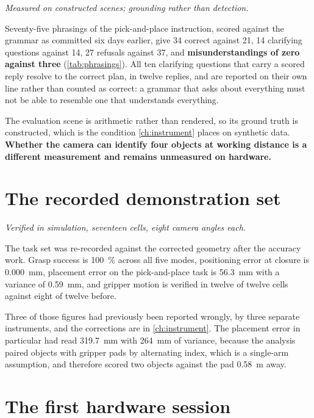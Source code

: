 \emph{Measured on constructed scenes; grounding rather than detection.}

Seventy-five phrasings of the pick-and-place instruction, scored against the
grammar as committed six days earlier, give 34 correct against 21, 14
clarifying questions against 14, 27 refusals against 37, and
\textbf{misunderstandings of zero against three}
(\cref{tab:phrasings}). All ten clarifying questions that carry a scored reply
resolve to the correct plan, in twelve replies, and are reported on their own
line rather than counted as correct: a grammar that asks about everything must
not be able to resemble one that understands everything.

The evaluation scene is arithmetic rather than rendered, so its ground truth
is constructed, which is the condition \cref{ch:instrument} places on
synthetic data. \textbf{Whether the camera can identify four objects at
working distance is a different measurement and remains unmeasured on
hardware.}

\section{The recorded demonstration set}

\emph{Verified in simulation, seventeen cells, eight camera angles each.}

The task set was re-recorded against the corrected geometry after the accuracy
work. Grasp success is \SI{100}{\percent} across all five modes, positioning
error at closure is \SI{0.000}{\milli\metre}, placement error on the
pick-and-place task is \SI{56.3}{\milli\metre} with a variance of
\SI{0.59}{\milli\metre}, and gripper motion is verified in twelve of twelve
cells against eight of twelve before.

Three of those figures had previously been reported wrongly, by three separate
instruments, and the corrections are in \cref{ch:instrument}. The placement
error in particular had read \SI{319.7}{\milli\metre} with
\SI{264}{\milli\metre} of variance, because the analysis paired objects with
gripper pads by alternating index, which is a single-arm assumption, and
therefore scored two objects against the pad \SI{0.58}{\metre} away.

\section{The first hardware session}
\label{sec:hardware-session}
\label{sec:hardware}

